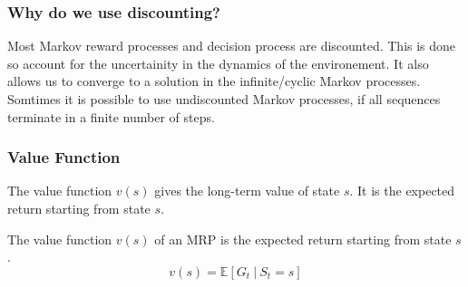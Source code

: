\subsubsection*{Why do we use discounting?}
Most Markov reward processes and decision process are discounted. This is done so account 
for the uncertainity in the dynamics of the environement. It also allows us to converge to
a solution in the infinite/cyclic Markov processes. Somtimes it is possible to 
use undiscounted Markov processes, if all sequences terminate in a finite number of steps.

\subsubsection{Value Function}
The value function \(v(s)\) gives the long-term value of state \(s\). It is the expected 
return starting from state \(s\).
\begin{definition}
    The value function \(v(s)\) of an MRP is the expected return starting from state \(s\).
    \[
        v(s) = \mathbb{E}  [ G_{t} \ |\  S_{t} = s]  
    \]
\end{definition}

